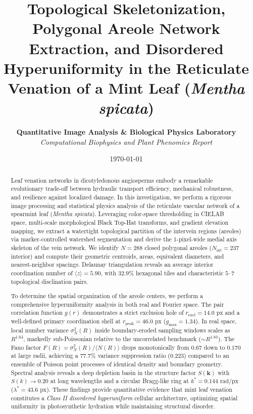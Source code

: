 \documentclass[10pt,twocolumn]{article}
\title{\textbf{\Large Topological Skeletonization, Polygonal Areole Network Extraction, and Disordered Hyperuniformity in the Reticulate Venation of a Mint Leaf (\textit{Mentha spicata})}}
\author{
    \textbf{Quantitative Image Analysis \& Biological Physics Laboratory} \\
    \textit{Computational Biophysics and Plant Phenomics Report}
}
\date{\today}
\begin{document}
\maketitle

\begin{abstract}
Leaf venation networks in dicotyledonous angiosperms embody a remarkable evolutionary trade-off between hydraulic transport efficiency, mechanical robustness, and resilience against localized damage. In this investigation, we perform a rigorous image processing and statistical physics analysis of the reticulate vascular network of a spearmint leaf (\textit{Mentha spicata}). Leveraging color-space thresholding in CIELAB space, multi-scale morphological Black Top-Hat transforms, and gradient elevation mapping, we extract a watertight topological partition of the intervein regions (areoles) via marker-controlled watershed segmentation and derive the 1-pixel-wide medial axis skeleton of the vein network. We identify $N = 288$ closed polygonal areoles ($N_{\mathrm{int}} = 237$ interior) and compute their geometric centroids, areas, equivalent diameters, and nearest-neighbor spacings. Delaunay triangulation reveals an average interior coordination number of $\langle z \rangle = 5.90$, with $32.9\%$ hexagonal tiles and characteristic $5$--$7$ topological disclination pairs. 

To determine the spatial organization of the areole centers, we perform a comprehensive hyperuniformity analysis in both real and Fourier space. The pair correlation function $g(r)$ demonstrates a strict exclusion hole of $r_{\mathrm{excl}} = 14.0\text{ px}$ and a well-defined primary coordination shell at $r_{\mathrm{peak}} = 46.0\text{ px}$ ($g_{\mathrm{max}} = 1.34$). In real space, local number variance $\sigma_N^2(R)$ inside boundary-eroded sampling windows scales as $R^{1.64}$, markedly sub-Poissonian relative to the uncorrelated benchmark ($\sim R^{1.83}$). The Fano factor $F(R) = \sigma_N^2(R)/\langle N(R) \rangle$ drops monotonically from $0.67$ down to $0.170$ at large radii, achieving a $77.7\%$ variance suppression ratio ($0.223$) compared to an ensemble of Poisson point processes of identical density and boundary geometry. Spectral analysis reveals a deep depletion basin in the structure factor $S(\mathbf{k})$ with $S(k) \to 0.20$ at long wavelengths and a circular Bragg-like ring at $k^* = 0.144\text{ rad/px}$ ($\lambda^* = 43.6\text{ px}$). These findings provide quantitative evidence that mint leaf venation constitutes a \textit{Class II disordered hyperuniform} cellular architecture, optimizing spatial uniformity in photosynthetic hydration while maintaining structural disorder.
\end{abstract}
\end{document}
